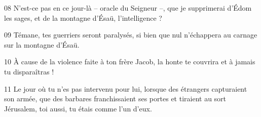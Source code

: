 
08 N’est-ce pas en ce jour-là – oracle du Seigneur –, que je supprimerai d’Édom les sages, et de la montagne d’Ésaü, l’intelligence ?

09 Témane, tes guerriers seront paralysés, si bien que nul n’échappera au carnage sur la montagne d’Ésaü.

10 À cause de la violence faite à ton frère Jacob, la honte te couvrira et à jamais tu disparaîtras !

11 Le jour où tu n’es pas intervenu pour lui, lorsque des étrangers capturaient son armée, que des barbares franchissaient ses portes et tiraient au sort Jérusalem, toi aussi, tu étais comme l’un d’eux.
